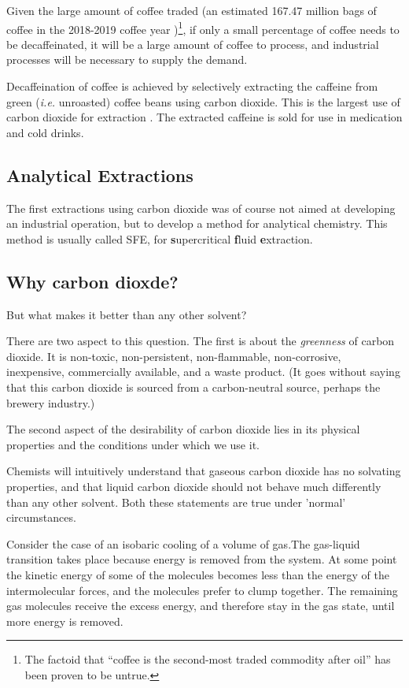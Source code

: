 Given the large amount of coffee traded (an estimated 167.47 million bags of
coffee in the 2018-2019 coffee year \autocite{Coffee2018})\footnote{The factoid
that ``coffee is the second-most traded commodity after oil'' has been proven to
be untrue.\autocite{Greenberg2017}}, if only a small percentage of coffee needs
to be decaffeinated, it will be a large amount of coffee to process, and
industrial processes will be necessary to supply the demand.

Decaffeination of coffee is achieved by selectively extracting the caffeine from
green (\textit{i.e.} unroasted) coffee beans using carbon dioxide. This is the
largest use of carbon dioxide for extraction \autocite{Ramalakshmi1999}. The
extracted caffeine is sold for use in medication and cold drinks. 

\subsection{Analytical Extractions}

The first extractions using carbon dioxide was of course not aimed at developing
an industrial operation, but to develop a method for analytical chemistry. This
method is usually called SFE, for \textbf{s}upercritical \textbf{f}luid
\textbf{e}xtraction.

\subsection{Why carbon dioxde?}

But what makes it better than any other solvent?

There are two aspect to this question. The first is about the \textit{greenness}
of carbon dioxide. It is non-toxic, non-persistent, non-flammable,
non-corrosive, inexpensive, commercially available, and a waste product. (It
goes without saying that this carbon dioxide is sourced from a carbon-neutral
source, perhaps the brewery industry.)

The second aspect of the desirability of carbon dioxide lies in its physical
properties and the conditions under which we use it. 

Chemists will intuitively understand that gaseous carbon dioxide has no solvating
properties, and that liquid carbon dioxide should not behave much differently
than any other solvent. Both these statements are true under 'normal' circumstances.

Consider the case of an isobaric cooling of a volume of gas.The gas-liquid
transition takes place because energy is removed from the system.
At some point the kinetic energy of some of the molecules becomes less than the
energy of the intermolecular forces, and the molecules prefer to clump together.
The remaining gas molecules receive the excess energy, and therefore stay in the
gas state, until more energy is removed.

